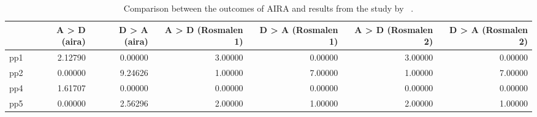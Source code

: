 \begin{table}[ht]
\centering
\begin{tabular}{rrrrrrr}
  \toprule
 & A > D (aira) & D > A (aira) & A > D (Rosmalen 1) & D > A (Rosmalen 1) & A > D (Rosmalen 2) & D > A (Rosmalen 2) \\ 
  \midrule
pp1 & 2.12790 & 0.00000 & 3.00000 & 0.00000 & 3.00000 & 0.00000 \\ 
  pp2 & 0.00000 & 9.24626 & 1.00000 & 7.00000 & 1.00000 & 7.00000 \\ 
  pp4 & 1.61707 & 0.00000 & 0.00000 & 0.00000 & 0.00000 & 0.00000 \\ 
  pp5 & 0.00000 & 2.56296 & 2.00000 & 1.00000 & 2.00000 & 1.00000 \\ 
   \bottomrule
\end{tabular}
\caption{Comparison between the outcomes of AIRA and results from the study by \citeauthor{RefWorks:4}~\cite{RefWorks:4}.} 
\label{tab:comparison}
\end{table}
